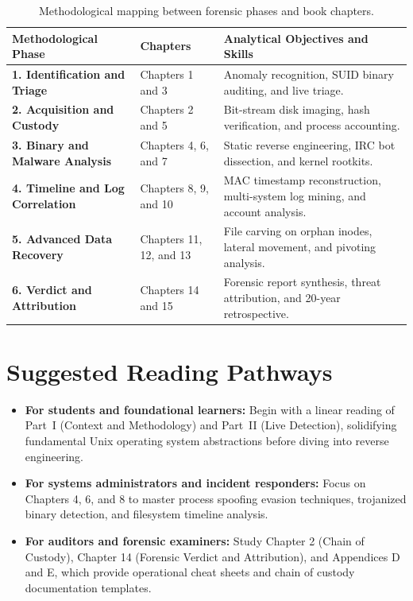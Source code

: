 \begin{table}[htbp]
\centering
\small
\begin{tabularx}{\textwidth}{@{} p{3.8cm} p{2.6cm} X @{}}
\toprule
\textbf{Methodological Phase} & \textbf{Chapters} & \textbf{Analytical Objectives and Skills} \\
\midrule
\textbf{1. Identification and Triage} & Chapters 1 and 3 & Anomaly recognition, SUID binary auditing, and live triage. \\
\addlinespace
\textbf{2. Acquisition and Custody} & Chapters 2 and 5 & Bit-stream disk imaging, hash verification, and process accounting. \\
\addlinespace
\textbf{3. Binary and Malware Analysis} & Chapters 4, 6, and 7 & Static reverse engineering, IRC bot dissection, and kernel rootkits. \\
\addlinespace
\textbf{4. Timeline and Log Correlation} & Chapters 8, 9, and 10 & MAC timestamp reconstruction, multi-system log mining, and account analysis. \\
\addlinespace
\textbf{5. Advanced Data Recovery} & Chapters 11, 12, and 13 & File carving on orphan inodes, lateral movement, and pivoting analysis. \\
\addlinespace
\textbf{6. Verdict and Attribution} & Chapters 14 and 15 & Forensic report synthesis, threat attribution, and 20-year retrospective. \\
\bottomrule
\end{tabularx}
\caption{Methodological mapping between forensic phases and book chapters.}
\label{tab:matriz_nist}
\end{table}

\section*{Suggested Reading Pathways}

\begin{itemize}
    \item \textbf{For students and foundational learners:} Begin with a linear reading of Part~I (Context and Methodology) and Part~II (Live Detection), solidifying fundamental Unix operating system abstractions before diving into reverse engineering.
    \item \textbf{For systems administrators and incident responders:} Focus on Chapters 4, 6, and 8 to master process spoofing evasion techniques, trojanized binary detection, and filesystem timeline analysis.
    \item \textbf{For auditors and forensic examiners:} Study Chapter 2 (Chain of Custody), Chapter 14 (Forensic Verdict and Attribution), and Appendices D and E, which provide operational cheat sheets and chain of custody documentation templates.
\end{itemize}
